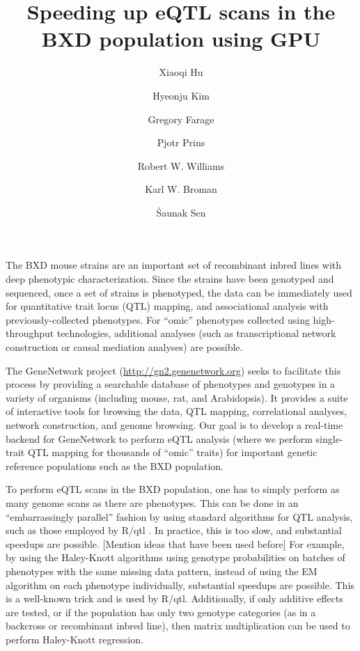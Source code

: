 \documentclass[9pt,twocolumn,twoside,lineno]{gsag3jnl}
\title{Speeding up eQTL scans in the BXD population using GPU}
\author[$\ast$]{Xiaoqi Hu}
\author[$\ast$]{Hyeonju Kim}
\author[$\ast$]{Gregory Farage}
\author[$\dagger$]{Pjotr Prins}
\author[$\dagger$]{Robert W. Williams}
\author[$\S$]{Karl W. Broman}
\author[$\ast$,1]{\'Saunak Sen}
\affil[$\ast$]{Department of Preventive Medicine, University of Tennessee Health Science Center, Memphis, TN}
\affil[$\dagger$]{Department of Genetics, Genomics and Informatics, University of Tennessee Health Science Center, Memphis, TN}
\affil[$\S$]{Department of Biostatistics, University of Wisconsin-Madison, Madison, WI}
\begin{document}
\maketitle
\thispagestyle{firststyle}
\logomark
\articletypemark
\marginmark
\firstpagefootnote


\vspace{-23pt}%

\noindent The BXD mouse strains are an important set of recombinant
inbred lines with deep phenotypic characterization.  Since the strains
have been genotyped and sequenced, once a set of strains is
phenotyped, the data can be immediately used for quantitative
trait locus (QTL) mapping, and associational analysis with
previously-collected phenotypes.  For ``omic'' phenotypes collected
using high-throughput technologies, additional analyses (such as
transcriptional network construction or causal mediation analyses) are
possible.  

The GeneNetwork project (\url{http://gn2.genenetwork.org})
seeks to facilitate this process by providing a searchable database of
phenotypes and genotypes in a variety of organisms (including mouse,
rat, and Arabidopsis).  It provides a suite of interactive tools for
browsing the data, QTL mapping, correlational analyses, network
construction, and genome browsing. Our goal is to develop a real-time
backend for GeneNetwork to perform eQTL analysis (where we perform
single-trait QTL mapping for thousands of ``omic'' traits) for
important genetic reference populations such as the BXD population.

To perform eQTL scans in the BXD population, one has to simply perform
as many genome scans as there are phenotypes.  This can be done in an
``embarrassingly parallel'' fashion by using standard algorithms for
QTL analysis, such as those employed by R/qtl \citep{broman2003r}.  In practice,
this is too slow, and substantial speedups are possible.  [Mention
  ideas that have been used before] For example, by using the
Haley-Knott algorithms \citep{haley1992simple} using genotype probabilities on batches of
phenotypes with the same missing data pattern, instead of using the EM
algorithm \citep{lander1989mapping} on each phenotype individually, substantial speedups are
possible. This is a well-known trick and is used by R/qtl.
Additionally, if only additive effects are tested, or if the
population has only two genotype categories (as in a backcross or
recombinant inbred line), then matrix multiplication can be used to
perform Haley-Knott regression.
\end{document}
